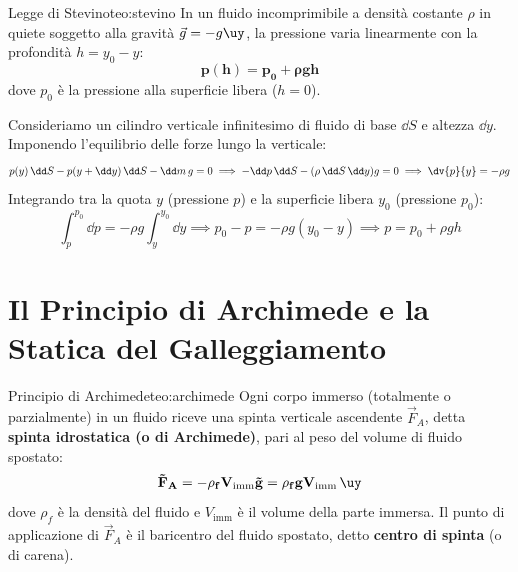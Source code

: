 \begin{teorema}{Legge di Stevino}{teo:stevino}
In un fluido incomprimibile a densità costante $\rho$ in quiete soggetto alla gravità $\vec{g} = -g\uy$, la pressione varia linearmente con la profondità $h = y_0 - y$:
\begin{equation}
    \mathbf{p(h) = p_0 + \rho g h}
    \label{eq:legge_stevino}
\end{equation}
dove $p_0$ è la pressione alla superficie libera ($h=0$).
\end{teorema}

\begin{dimostrazione}
Consideriamo un cilindro verticale infinitesimo di fluido di base $\dd S$ e altezza $\dd y$. Imponendo l'equilibrio delle forze lungo la verticale:
\begin{equation}
    p(y)\,\dd S - p(y+\dd y)\,\dd S - \dd m\,g = 0 \implies -\dd p\,\dd S - (\rho\,\dd S\,\dd y)g = 0 \implies \dv{p}{y} = -\rho g
\end{equation}
Integrando tra la quota $y$ (pressione $p$) e la superficie libera $y_0$ (pressione $p_0$):
\begin{equation}
    \int_{p}^{p_0} \dd p = -\rho g \int_y^{y_0} \dd y \implies p_0 - p = -\rho g (y_0 - y) \implies p = p_0 + \rho g h
\end{equation}
\end{dimostrazione}

\section{Il Principio di Archimede e la Statica del Galleggiamento}
\label{sec:principio_archimede}

\begin{teorema}{Principio di Archimede}{teo:archimede}
Ogni corpo immerso (totalmente o parzialmente) in un fluido riceve una spinta verticale ascendente $\vec{F}_A$, detta \textbf{spinta idrostatica (o di Archimede)}, pari al peso del volume di fluido spostato:
\begin{equation}
    \mathbf{\vec{F}_A = -\rho_f V_{\text{imm}}\vec{g} = \rho_f g V_{\text{imm}}\,\uy}
    \label{eq:archimede}
\end{equation}
dove $\rho_f$ è la densità del fluido e $V_{\text{imm}}$ è il volume della parte immersa. Il punto di applicazione di $\vec{F}_A$ è il baricentro del fluido spostato, detto \textbf{centro di spinta} (o di carena).
\end{teorema}

